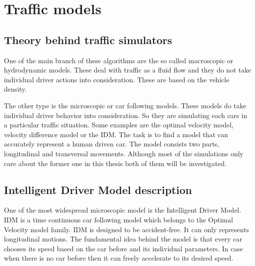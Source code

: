\documentclass[a4paper,12pt,twoside]{report}
\begin{document}
	\chapter{Traffic models}
		\section{Theory behind traffic simulators}
			One of the main branch of these algorithms are the so called macroscopic or hydrodynamic models. These deal with traffic as a fluid flow and they do not take individual driver actions into consideration. These are based on the vehicle density.

			The other type is the microscopic or car following models. These models do take individual driver behavior into consideration. So they are simulating each cars in a particular traffic situation. Some examples are the optimal velocity model, velocity difference model or the IDM. The task is to find a model that can accurately represent a human driven car. The model consists two parts, longitudinal and transversal movements. Although most of the simulations only care about the former one in this thesis both of them will be investigated.
		\section{Intelligent Driver Model description} \label{sec:IDM}
			One of the most widespread microscopic model is the Intelligent Driver Model. IDM is a time continuous car following model which belongs to the Optimal Velocity model family. IDM is designed to be accident-free. It can only represents longitudinal motions. The fundamental idea behind the model is that every car chooses its speed based on the car before and its individual parameters. In case when there is no car before then it can freely accelerate to its desired speed.
\end{document}
